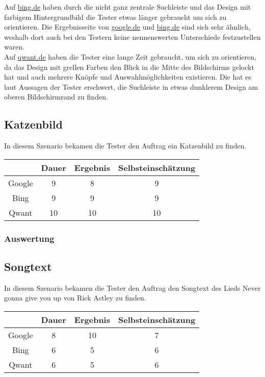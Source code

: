 \noindent Auf \url{bing.de} haben durch die nicht ganz zentrale Suchleiste und das Design mit farbigem Hintergrundbild die Tester etwas länger gebraucht um sich zu orientieren.
Die Ergebnisseite von \url{google.de} und \url{bing.de} sind sich sehr ähnlich, weshalb dort auch bei den Testern keine nennenswerten Unterschiede festzustellen waren.\\

\noindent Auf \url{qwant.de} haben die Tester eine lange Zeit gebraucht, um sich zu orientieren,
da das Design mit grellen Farben den Blick in die Mitte des Bildschirms gelockt hat und auch mehrere Knöpfe und Auswahlmöglichkeiten existieren.
Die hat es laut Aussagen der Tester erschwert, die Suchleiste in etwas dunklerem Design am oberen Bildschirmrand zu finden.

\subsection{Katzenbild}\label{subsec:szenario2}
In diesem Szenario bekamen die Tester den Auftrag ein Katzenbild zu finden.

\begin{tabular}{|c|c|c|c|}
    \hline
    & Dauer & Ergebnis & Selbsteinschätzung \\
    \hline
    Google & 9     & 8        & 9                  \\
    \hline
    Bing   & 9     & 9        & 9                  \\
    \hline
    Qwant  & 10    & 10       & 10                 \\
    \hline
\end{tabular}

\subsubsection*{Auswertung}

\subsection{Songtext}\label{subsec:szenario3}
In diesem Szenario bekamen die Tester den Auftrag den Songtext des Lieds Never gonna give you up von Rick Astley zu finden.

\begin{tabular}{|c|c|c|c|}
    \hline
    & Dauer & Ergebnis & Selbsteinschätzung \\
    \hline
    Google & 8     & 10       & 7                  \\
    \hline
    Bing   & 6     & 5        & 6                  \\
    \hline
    Qwant  & 6     & 5        & 6                  \\
    \hline
\end{tabular}

